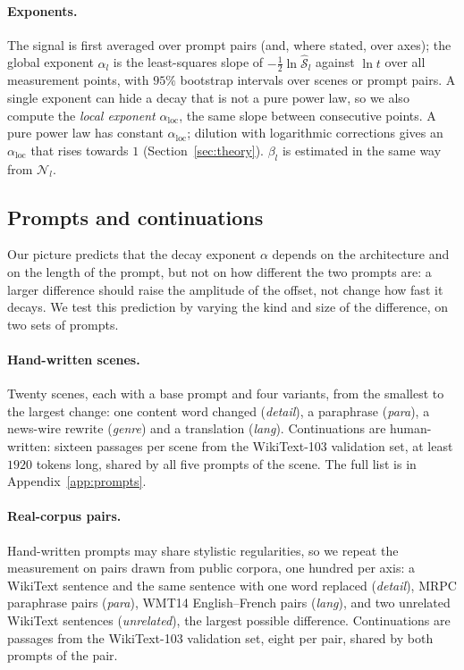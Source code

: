 \documentclass[11pt]{article}
\theoremstyle{definition}
\theoremstyle{remark}
\begin{document}
\paragraph{Exponents.} The signal is first averaged over prompt pairs (and, where stated, over axes); the global exponent $\alpha_l$ is the least-squares slope of $-\tfrac12\ln\widehat{\mathcal S}_l$ against $\ln t$ over all measurement points, with $95\%$ bootstrap intervals over scenes or prompt pairs. A single exponent can hide a decay that is not a pure power law, so we also compute the \emph{local exponent} $\alpha_{\mathrm{loc}}$, the same slope between consecutive points. A pure power law has constant $\alpha_{\mathrm{loc}}$; dilution with logarithmic corrections gives an $\alpha_{\mathrm{loc}}$ that rises towards $1$ (Section~\ref{sec:theory}). $\beta_l$ is estimated in the same way from $\mathcal N_l$.

\subsection{Prompts and continuations}\label{sec:measure-data}

Our picture predicts that the decay exponent $\alpha$ depends on the architecture and on the length of the prompt, but not on how different the two prompts are: a larger difference should raise the amplitude of the offset, not change how fast it decays. We test this prediction by varying the kind and size of the difference, on two sets of prompts.

\paragraph{Hand-written scenes.} Twenty scenes, each with a base prompt and four variants, from the smallest to the largest change: one content word changed (\emph{detail}), a paraphrase (\emph{para}), a news-wire rewrite (\emph{genre}) and a translation (\emph{lang}). Continuations are human-written: sixteen passages per scene from the WikiText-103 validation set, at least $1920$ tokens long, shared by all five prompts of the scene. The full list is in Appendix~\ref{app:prompts}.

\paragraph{Real-corpus pairs.} Hand-written prompts may share stylistic regularities, so we repeat the measurement on pairs drawn from public corpora, one hundred per axis: a WikiText sentence and the same sentence with one word replaced (\emph{detail}), MRPC paraphrase pairs (\emph{para}), WMT14 English--French pairs (\emph{lang}), and two unrelated WikiText sentences (\emph{unrelated}), the largest possible difference. Continuations are passages from the WikiText-103 validation set, eight per pair, shared by both prompts of the pair.
\end{document}
